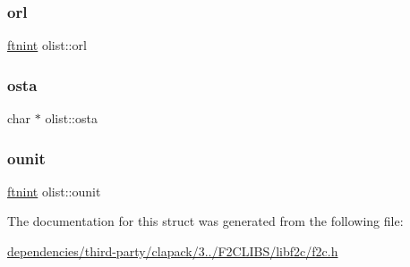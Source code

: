 \mbox{\label{structolist_a4c83b168f7afdd6c81a7843193c5755e}} 
\subsubsection{\texorpdfstring{orl}{orl}}
{\footnotesize\ttfamily \hyperlink{dependencies_2third-party_2clapack_23_82_81_2_f2_c_l_i_b_s_2libf2c_2f2c_8h_a9d70cdb573fb2bf020e1f6dba85fb1cc}{ftnint} olist\+::orl}

\mbox{\label{structolist_a39125d0805bc5bef366a1a3492c2fe68}} 
\subsubsection{\texorpdfstring{osta}{osta}}
{\footnotesize\ttfamily char $\ast$ olist\+::osta}

\mbox{\label{structolist_af4443a6a577bfe9292cbf741c24c6e79}} 
\subsubsection{\texorpdfstring{ounit}{ounit}}
{\footnotesize\ttfamily \hyperlink{dependencies_2third-party_2clapack_23_82_81_2_f2_c_l_i_b_s_2libf2c_2f2c_8h_a9d70cdb573fb2bf020e1f6dba85fb1cc}{ftnint} olist\+::ounit}



The documentation for this struct was generated from the following file\+:\begin{DoxyCompactItemize}
\item 
\hyperlink{dependencies_2third-party_2clapack_23_82_81_2_f2_c_l_i_b_s_2libf2c_2f2c_8h}{dependencies/third-\/party/clapack/3../\+F2\+C\+L\+I\+B\+S/libf2c/f2c.\+h}\end{DoxyCompactItemize}
